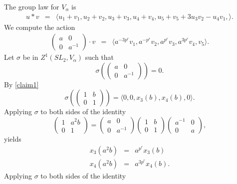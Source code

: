 \begin{example}
	The group law for $V_\alpha$ is
	\begin{eqnarray*}
		u * v &=&
		\langle
		u_1 + v_1,
		u_2 + v_2,
		u_3 + v_3,
		u_4 + v_4,
		u_5 + v_5 + 3u_3v_2 - u_4v_1,
		\rangle.
	\end{eqnarray*}
		We compute the action
	\begin{eqnarray*}
		\left(\begin{matrix} a & 0 \\ 0 & a^{-1} \end{matrix}\right)\cdot v &=&
		\langle 
		a^{-3p^r}v_1,
		a^{-p^r}v_2,
		a^{p^r}v_3,
		a^{3p^r}v_4,
		v_5
		\rangle.
	\end{eqnarray*}
	Let $\sigma$ be in $Z^1(SL_2, V_\alpha)$ such that
	\begin{displaymath}
		\sigma\left(\left(\begin{matrix}a & 0\\0 & a^{-1}\end{matrix}\right)\right) = 0.
	\end{displaymath}
	By \ref{claim1}
	\begin{displaymath}
		\sigma\left(\left(\begin{matrix} 1 & b \\ 0 & 1 \end{matrix}\right)\right) =
		\langle 
		0,
		0,
		x_3(b),
		x_4(b),
		0
		\rangle.
	\end{displaymath}
	Applying $\sigma$ to both sides of the identity
	\begin{displaymath}
		\left(\begin{matrix} 1 & a^2b \\ 0 & 1 \end{matrix}\right)
		= 
		\left(\begin{matrix} a & 0 \\ 0 & a^{-1} \end{matrix}\right)
		\left(\begin{matrix} 1 & b \\ 0 & 1 \end{matrix}\right)
		\left(\begin{matrix} a^{-1} & 0 \\ 0 & a \end{matrix}\right),
	\end{displaymath}
	yields
	\begin{eqnarray*}
		x_3(a^2b) &=& a^{p^r}x_3(b)\\
		x_4(a^2b) &=& a^{3p^r}x_4(b).
	\end{eqnarray*}
	Applying $\sigma$ to both sides of the identity

\end{example}
